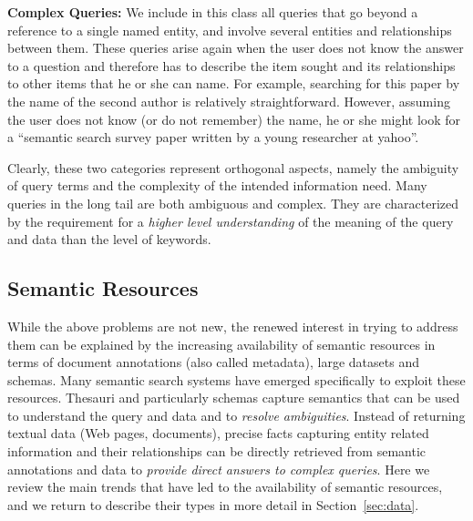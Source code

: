 	\textbf{Complex Queries:} We include in this class all queries that go beyond a reference to a single named entity, and involve several entities and relationships between them. These queries arise again when the user does not know the answer to a question and therefore has to describe the item sought and its relationships to other items that he or she can name. For example, searching for this paper by the name of the second author is relatively straightforward. However, assuming the user does not know (or do not remember) the name, he or she might look for a ``semantic search survey paper written by a young researcher at yahoo''. 

Clearly, these two categories represent orthogonal aspects, namely the ambiguity of query terms and the complexity of the intended information need. Many queries in the long tail are both ambiguous and complex. They are characterized by the requirement for a \emph{higher level understanding} of the meaning of the query and data than the level of keywords. 

\subsection{Semantic Resources}

While the above problems are not new, the renewed interest in trying to address them can be explained by the increasing availability of semantic resources in terms of document annotations (also called metadata), large datasets and schemas. Many semantic search systems have emerged specifically to exploit these resources. 
Thesauri and particularly schemas capture semantics that can be used to understand the query and data and to \emph{resolve ambiguities}. Instead of returning textual data (Web pages, documents), precise facts capturing entity related information and their relationships can be directly retrieved from semantic annotations and data to \emph{provide direct answers to complex queries}. Here we review the main trends that have led to the availability of semantic resources, and we return to describe their types in more detail in Section~\ref{sec:data}. 

